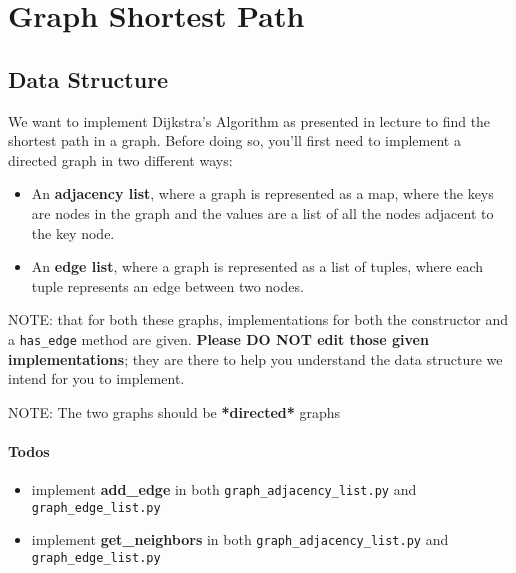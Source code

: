 \documentclass{article}
\begin{document}
	\section{Graph Shortest Path}
	\subsection{Data Structure}

   We want to implement Dijkstra's Algorithm as presented in lecture to find the shortest path in a graph. Before doing so, you'll first need to implement a directed graph in two different ways:
   \begin{itemize}
       \item An \textbf{adjacency list}, where a graph is represented as a map, where the keys are nodes in the graph and the values are a list of all the nodes adjacent to the key node.
       \item An \textbf{edge list}, where a graph is represented as a list of tuples, where each tuple represents an edge between two nodes.
       
   \end{itemize}
   
   NOTE: that for both these graphs, implementations for both the constructor and a \verb|has_edge| method are given. \textbf{Please DO NOT edit those given implementations}; they are there to help you understand the data structure we intend for you to implement.
   
   NOTE: The two graphs should be \textbf{*directed*} graphs
   
   \paragraph{Todos}
   \begin{itemize}
        \item {implement \textbf{add\_edge} in both \verb|graph_adjacency_list.py| and \verb|graph_edge_list.py|}
        \item {implement \textbf{get\_neighbors} in both \verb|graph_adjacency_list.py| and \verb|graph_edge_list.py|}

   \end{itemize}
   
\end{document}
